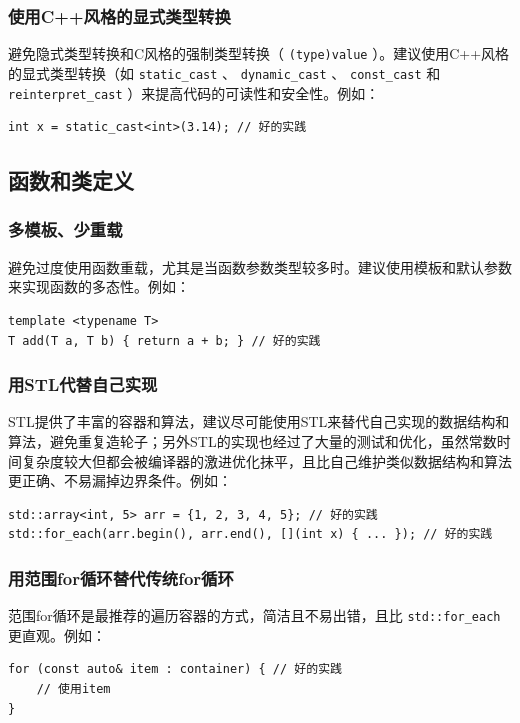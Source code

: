 \subsubsection{使用C++风格的显式类型转换}

避免隐式类型转换和C风格的强制类型转换（ \texttt{(type)value} ）。建议使用C++风格的显式类型转换（如 \texttt{static\_cast} 、 \texttt{dynamic\_cast} 、 \texttt{const\_cast} 和 \texttt{reinterpret\_cast} ）来提高代码的可读性和安全性。例如：
\begin{verbatim}
int x = static_cast<int>(3.14); // 好的实践
\end{verbatim}

\subsection{函数和类定义}

\subsubsection{多模板、少重载}

避免过度使用函数重载，尤其是当函数参数类型较多时。建议使用模板和默认参数来实现函数的多态性。例如：
\begin{verbatim}
template <typename T>
T add(T a, T b) { return a + b; } // 好的实践
\end{verbatim}

\subsubsection{用STL代替自己实现}

STL提供了丰富的容器和算法，建议尽可能使用STL来替代自己实现的数据结构和算法，避免重复造轮子；另外STL的实现也经过了大量的测试和优化，虽然常数时间复杂度较大但都会被编译器的激进优化抹平，且比自己维护类似数据结构和算法更正确、不易漏掉边界条件。例如：
\begin{verbatim}
std::array<int, 5> arr = {1, 2, 3, 4, 5}; // 好的实践
std::for_each(arr.begin(), arr.end(), [](int x) { ... }); // 好的实践
\end{verbatim}

\subsubsection{用范围for循环替代传统for循环}

范围for循环是最推荐的遍历容器的方式，简洁且不易出错，且比 \texttt{std::for\_each} 更直观。例如：
\begin{verbatim}
for (const auto& item : container) { // 好的实践
    // 使用item
}
\end{verbatim}

